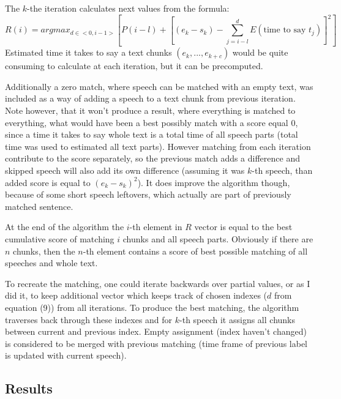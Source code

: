 \documentclass[12pt,a4paper,english]{article}
\begin{document}
The $k$-the iteration calculates next values from the formula:
\begin{equation}
    R(i) = argmax_{d \in <0, i - 1>} [P(i-l) + [(e_k - s_k) - \sum_{j = i - l}^d E(\text{time to say }t_j)]^2 ]
\end{equation}
Estimated time it takes to say a text chunks $(e_k, ..., e_{k+c})$ would be quite consuming to calculate at each iteration, but it can be precomputed. \newline

Additionally a zero match, where speech can be matched with an empty text, was included as a way of adding a speech to a text chunk from previous iteration.  Note however, that it won't produce a result, where everything is matched to everything, what would have been a best possibly match with a score equal 0, since a time it takes to say whole text is a total time of all speech parts (total time was used to estimated all text parts). \newline
However matching from each iteration contribute to the score separately, so the previous match adds a difference and skipped speech will also add its own difference (assuming it was $k$-th speech, than added score is equal to $(e_k - s_k)^2$). \newline
It does improve the algorithm though, because of some short speech leftovers, which actually are part of previously matched sentence. \newline

\newpage
At the end of the algorithm the $i$-th element in $R$ vector is equal to the best cumulative score of matching $i$ chunks and all speech parts. Obviously if there are $n$ chunks, then the $n$-th element contains a score of best possible matching of all speeches and whole text. \newline

To recreate the matching, one could iterate backwards over partial values, or as I did it, to keep additional vector which keeps track of chosen indexes ($d$ from equation (9)) from all iterations. To produce the best matching, the algorithm traverses back through these indexes and for $k$-th speech it assigns all chunks between current and previous index. Empty assignment (index haven't changed) is considered to be merged with previous matching (time frame of previous label is updated with current speech). \newline
\newline

\subsection{Results}
\end{document}
